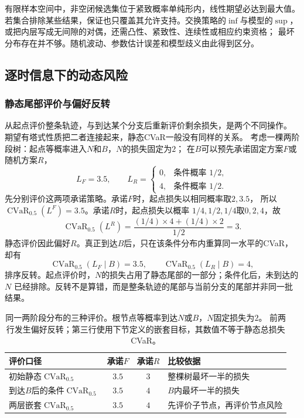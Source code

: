 有限样本空间中，非空闭候选集位于紧致概率单纯形内，线性期望必达到最大值。
若集合排除某些结果，保证也只覆盖其允许支持。交换策略的$\inf$与模型的$\sup$，
或把内层写成无间隙的对偶，还需凸性、紧致性、连续性或相应约束资格；
最坏分布存在并不够。随机波动、参数估计误差和模型歧义由此得到区分。

\subsection{逐时信息下的动态风险}
\label{sec:decision-dynamic-risk-time-consistency}

\subsubsection{静态尾部评价与偏好反转}

从起点评价整条轨迹，与到达某个分支后重新评价剩余损失，是两个不同操作。
期望有塔式性质把二者连接起来，静态CVaR一般没有同样的关系。
考虑一棵两阶段树：起点等概率进入$N$和$B$，$N$的损失固定为$2$；
在$B$可以预先承诺固定方案$F$或随机方案$R$，
\[
  L_F=3.5,\qquad
  L_R=
  \begin{cases}
    0,&\text{条件概率 }1/2,\\
    4,&\text{条件概率 }1/2.
  \end{cases}
\]
先分别评价这两项承诺策略。承诺$F$时，起点损失以相同概率取$2,3.5$，
所以$\operatorname{CVaR}_{0.5}(L^F)=3.5$。承诺$R$时，起点损失以概率
$1/4,1/2,1/4$取$0,2,4$，故
\[
  \operatorname{CVaR}_{0.5}(L^R)
  =\frac{(1/4)\times4+(1/4)\times2}{1/2}=3.
\]
静态评价因此偏好$R$。真正到达$B$后，只在该条件分布内重算同一水平的CVaR，
却有
\[
  \operatorname{CVaR}_{0.5}(L_F\mid B)=3.5,\qquad
  \operatorname{CVaR}_{0.5}(L_R\mid B)=4,
\]
排序反转。起点评价时，$N$的损失占用了静态尾部的一部分；条件化后，未到达的$N$
已经排除。反转不是算错，而是整条轨迹的尾部与当前分支的尾部并非同一批结果。

\begin{table}[htbp]
  \centering
  \begin{tabularx}{\linewidth}{XccX}
    \toprule
    评价口径 & 承诺$F$ & 承诺$R$ & 比较依据\\
    \midrule
    初始静态$\operatorname{CVaR}_{0.5}$ & $3.5$ & $3$ & 整棵树最坏一半的损失\\
    到达$B$后的条件$\operatorname{CVaR}_{0.5}$ & $3.5$ & $4$ & $B$内最坏一半的损失\\
    两层嵌套$\operatorname{CVaR}_{0.5}$ & $3.5$ & $4$ & 先评价子节点，再评价节点风险\\
    \bottomrule
  \end{tabularx}
  \caption{同一两阶段分布的三种评价。根节点等概率到达$N$或$B$，$N$固定损失为$2$。
  前两行发生偏好反转；第三行使用下节定义的嵌套目标，其数值不等于静态总损失CVaR。}
  \label{tab:decision-static-conditional-nested}
\end{table}

